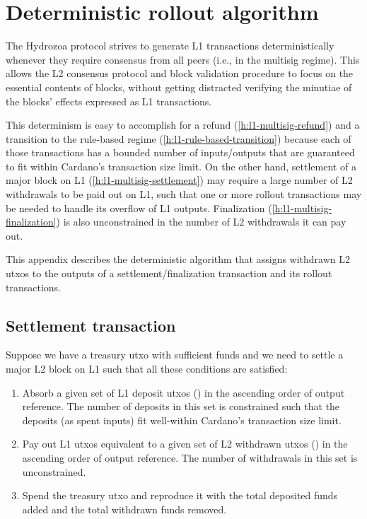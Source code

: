 \documentclass[../hydrozoa.tex]{subfiles}
\begin{document}
\chapter{Deterministic rollout algorithm}%
\label{h:deterministic-rollout-algorithm}%

The Hydrozoa protocol strives to generate L1 transactions deterministically whenever they require consensus from all peers (i.e., in the multisig regime).
This allows the L2 consensus protocol and block validation procedure to focus on the essential contents of blocks, without getting distracted verifying the minutiae of the blocks' effects expressed as L1 transactions. 

This determinism is easy to accomplish for a refund (\cref{h:l1-multisig-refund}) and a transition to the rule-based regime (\cref{h:l1-rule-based-transition}) because each of those transactions has a bounded number of inputs/outputs that are guaranteed to fit within Cardano's transaction size limit.
On the other hand, settlement of a major block on L1 (\cref{h:l1-multisig-settlement}) may require a large number of L2 withdrawals to be paid out on L1, such that one or more rollout transactions may be needed to handle its overflow of L1 outputs.
Finalization (\cref{h:l1-multisig-finalization}) is also unconstrained in the number of L2 withdrawals it can pay out.

This appendix describes the deterministic algorithm that assigns withdrawn L2 utxos to the outputs of a settlement/finalization transaction and its rollout transactions.

\section{Settlement transaction}%
\label{h:deterministic-rollout-settlement}%

Suppose we have a treasury utxo with sufficient funds and we need to settle a major L2 block on L1 such that all these conditions are satisfied:
\begin{enumerate}
  \item Absorb a given set of L1 deposit utxos () in the ascending order of output reference.
    The number of deposits in this set is constrained such that the deposits (as spent inputs) fit well-within Cardano's transaction size limit.
  \item Pay out L1 utxos equivalent to a given set of L2 withdrawn utxos () in the ascending order of output reference.
    The number of withdrawals in this set is unconstrained.
  \item Spend the treasury utxo and reproduce it with the total deposited funds added and the total withdrawn funds removed.
\end{enumerate}
\end{document}
